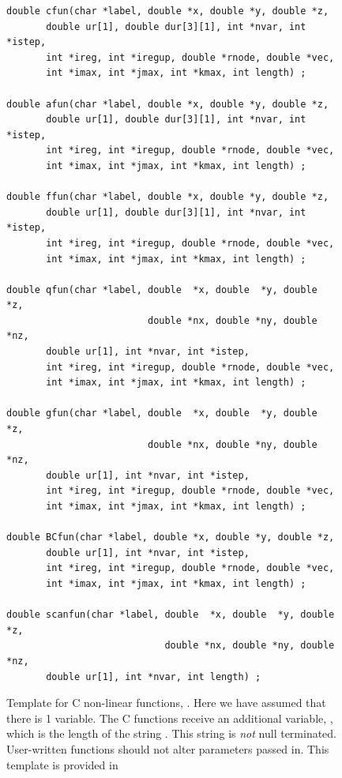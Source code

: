 \documentclass[a4paper,twoside,11pt]{book}
\begin{document}
\begin{figure}
\begin{verbatim}
double cfun(char *label, double *x, double *y, double *z, 
       double ur[1], double dur[3][1], int *nvar, int *istep, 
       int *ireg, int *iregup, double *rnode, double *vec, 
       int *imax, int *jmax, int *kmax, int length) ;

double afun(char *label, double *x, double *y, double *z, 
       double ur[1], double dur[3][1], int *nvar, int *istep, 
       int *ireg, int *iregup, double *rnode, double *vec, 
       int *imax, int *jmax, int *kmax, int length) ;

double ffun(char *label, double *x, double *y, double *z, 
       double ur[1], double dur[3][1], int *nvar, int *istep, 
       int *ireg, int *iregup, double *rnode, double *vec, 
       int *imax, int *jmax, int *kmax, int length) ;

double qfun(char *label, double  *x, double  *y, double  *z, 
                         double *nx, double *ny, double *nz,
       double ur[1], int *nvar, int *istep, 
       int *ireg, int *iregup, double *rnode, double *vec, 
       int *imax, int *jmax, int *kmax, int length) ;

double gfun(char *label, double  *x, double  *y, double  *z, 
                         double *nx, double *ny, double *nz,
       double ur[1], int *nvar, int *istep, 
       int *ireg, int *iregup, double *rnode, double *vec, 
       int *imax, int *jmax, int *kmax, int length) ;

double BCfun(char *label, double *x, double *y, double *z,
       double ur[1], int *nvar, int *istep, 
       int *ireg, int *iregup, double *rnode, double *vec, 
       int *imax, int *jmax, int *kmax, int length) ;

double scanfun(char *label, double  *x, double  *y, double  *z,
                            double *nx, double *ny, double *nz,
       double ur[1], int *nvar, int length) ;

\end{verbatim}
\caption{Template for C non-linear functions, . Here we
  have assumed that there is 1 variable. The C functions receive an
  additional variable, , which is the length of the string
  . This string is \emph{not} null terminated. User-written
  functions should not alter parameters passed in. This template is
  provided in }
\label{ctemplate}
\end{figure}
\end{document}
